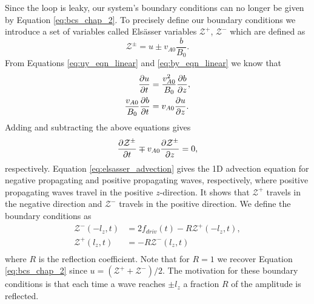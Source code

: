 Since the loop is leaky, our system's boundary conditions can no longer be given by Equation \eqref{eq:bcs_chap_2}. To precisely define our boundary conditions we introduce a set of variables called Els\"asser variables $\mathcal{Z}^+$, $\mathcal{Z}^-$ which are defined as
\begin{equation}
    \label{eq:elsasser_z}
    \mathcal{Z}^\pm = u \pm v_{A0}\frac{b}{B_0}.
\end{equation}
From Equations \eqref{eq:uy_eqn_linear} and \eqref{eq:by_eqn_linear} we know that
\begin{equation}
    \begin{aligned}
    \pdv{u}{t} &= \frac{v_{A0}^2}{B_0}\pdv{b}{z}, \\
    \frac{v_{A0}}{B_0}\pdv{b}{t} &= v_{A0}\pdv{u}{z}.
    \end{aligned}
\end{equation}
Adding and subtracting the above equations gives
\begin{equation}
    \label{eq:elsasser_advection}
    \pdv{\mathcal{Z}^\pm}{t}\mp v_{A0}\pdv{\mathcal{Z}^\pm}{z}=0,
\end{equation}
respectively. Equation \eqref{eq:elsasser_advection} gives the 1D advection equation for negative propagating and positive propagating waves, respectively, where positive propagating waves travel in the positive $z$-direction. It shows that $\mathcal{Z}^+$ travels in the negative direction and $\mathcal{Z}^-$ travels in the positive direction. We define the boundary conditions as 
\begin{equation}
    \label{eq:bcs_elsasser}
    \begin{aligned}
    \mathcal{Z}^-(-l_z, t) &= 2f_{driv}(t) - R \mathcal{Z}^+(-l_z, t), \\
    \mathcal{Z}^+(l_z, t) &= -R \mathcal{Z}^-(l_z, t) \\
    \end{aligned}
\end{equation}
where $R$ is the reflection coefficient. Note that for $R=1$ we recover Equation \eqref{eq:bcs_chap_2} since $u = (\mathcal{Z}^+ + \mathcal{Z}^-) / 2$. The motivation for these boundary conditions is that each time a wave reaches $\pm l_z$ a fraction $R$ of the amplitude is reflected.

